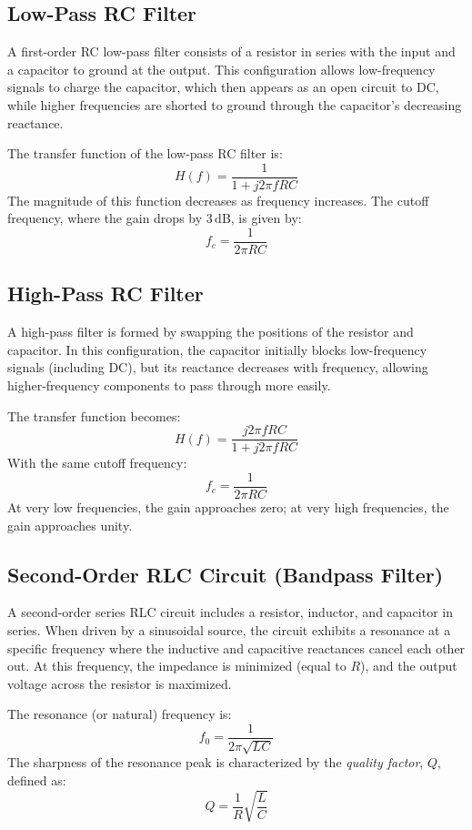 \documentclass[12pt]{article}
\begin{document}
\subsection{Low-Pass RC Filter}

A first-order RC low-pass filter consists of a resistor in series with the input and a capacitor to ground at the output. This configuration allows low-frequency signals to charge the capacitor, which then appears as an open circuit to DC, while higher frequencies are shorted to ground through the capacitor’s decreasing reactance.

The transfer function of the low-pass RC filter is:
\[
	H(f) = \frac{1}{1 + j2\pi fRC}
\]
The magnitude of this function decreases as frequency increases. The cutoff frequency, where the gain drops by $3\,\mathrm{dB}$, is given by:
\[
	f_c = \frac{1}{2\pi RC}
\]

\subsection{High-Pass RC Filter}

A high-pass filter is formed by swapping the positions of the resistor and capacitor. In this configuration, the capacitor initially blocks low-frequency signals (including DC), but its reactance decreases with frequency, allowing higher-frequency components to pass through more easily.

The transfer function becomes:
\[
	H(f) = \frac{j2\pi fRC}{1 + j2\pi fRC}
\]
With the same cutoff frequency:
\[
	f_c = \frac{1}{2\pi RC}
\]
At very low frequencies, the gain approaches zero; at very high frequencies, the gain approaches unity.

\subsection{Second-Order RLC Circuit (Bandpass Filter)}

A second-order series RLC circuit includes a resistor, inductor, and capacitor in series. When driven by a sinusoidal source, the circuit exhibits a resonance at a specific frequency where the inductive and capacitive reactances cancel each other out. At this frequency, the impedance is minimized (equal to $R$), and the output voltage across the resistor is maximized.

The resonance (or natural) frequency is:
\[
	f_0 = \frac{1}{2\pi\sqrt{LC}}
\]
The sharpness of the resonance peak is characterized by the \textit{quality factor}, $Q$, defined as:
\[
	Q = \frac{1}{R} \sqrt{\frac{L}{C}}
\]
\end{document}
